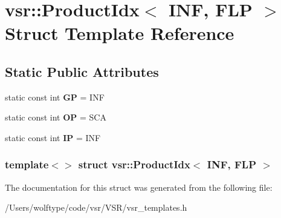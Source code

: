 \hypertarget{structvsr_1_1_product_idx_3_01_i_n_f_00_01_f_l_p_01_4}{\section{vsr\-:\-:Product\-Idx$<$ I\-N\-F, F\-L\-P $>$ Struct Template Reference}
\label{structvsr_1_1_product_idx_3_01_i_n_f_00_01_f_l_p_01_4}
}
\subsection*{Static Public Attributes}
\begin{DoxyCompactItemize}
\item 
\hypertarget{structvsr_1_1_product_idx_3_01_i_n_f_00_01_f_l_p_01_4_a059a91073be93f5e799a79692b2001b5}{static const int {\bfseries G\-P} = I\-N\-F}\label{structvsr_1_1_product_idx_3_01_i_n_f_00_01_f_l_p_01_4_a059a91073be93f5e799a79692b2001b5}

\item 
\hypertarget{structvsr_1_1_product_idx_3_01_i_n_f_00_01_f_l_p_01_4_a6d6eb8e7b10b2a41697d98beb465eded}{static const int {\bfseries O\-P} = S\-C\-A}\label{structvsr_1_1_product_idx_3_01_i_n_f_00_01_f_l_p_01_4_a6d6eb8e7b10b2a41697d98beb465eded}

\item 
\hypertarget{structvsr_1_1_product_idx_3_01_i_n_f_00_01_f_l_p_01_4_a27ac9c4791615886a4c86b3dbfc3358a}{static const int {\bfseries I\-P} = I\-N\-F}\label{structvsr_1_1_product_idx_3_01_i_n_f_00_01_f_l_p_01_4_a27ac9c4791615886a4c86b3dbfc3358a}

\end{DoxyCompactItemize}
\subsubsection*{template$<$$>$ struct vsr\-::\-Product\-Idx$<$ I\-N\-F, F\-L\-P $>$}



The documentation for this struct was generated from the following file\-:\begin{DoxyCompactItemize}
\item 
/\-Users/wolftype/code/vsr/\-V\-S\-R/vsr\-\_\-templates.\-h\end{DoxyCompactItemize}
